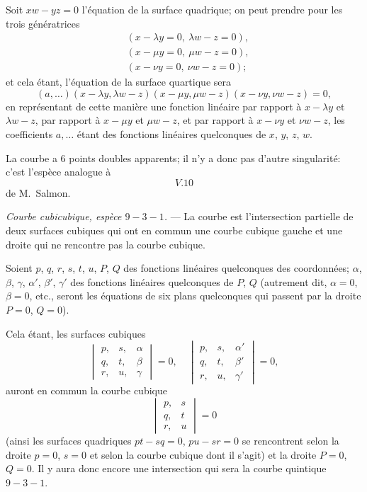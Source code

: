 \documentclass[11pt,a4paper]{article}
\begin{document}
Soit $xw - yz = 0$ l'\'{e}quation de la surface quadrique; on peut prendre pour les trois g\'{e}n\'{e}ratrices
\begin{align*}
& (x - \lambda y = 0, \ \lambda w - z = 0), \\
& (x - \mu y = 0, \ \mu w - z = 0), \\
& (x - \nu y = 0, \ \nu w - z = 0);
\end{align*}
et cela \'{e}tant, l'\'{e}quation de la surface quartique sera
\[
(a, \ldots)(x - \lambda y, \lambda w - z)(x - \mu y, \mu w - z)(x - \nu y, \nu w - z) = 0,
\]
en repr\'{e}sentant de cette mani\`{e}re une fonction lin\'{e}aire par rapport \`{a} $x - \lambda y$ et $\lambda w - z$, par rapport \`{a} $x - \mu y$ et $\mu w - z$, et par rapport \`{a} $x - \nu y$ et $\nu w - z$, les coefficients $a, \ldots$ \'{e}tant des fonctions lin\'{e}aires quelconques de $x$, $y$, $z$, $w$.

La courbe a 6 points doubles apparents; il n'y a donc pas d'autre singularit\'{e}: c'est l'esp\`{e}ce analogue \`{a}
\[
V.10
\]
de M.~Salmon.

\clearpage

\medskip
\noindent\textit{Courbe cubicubique, esp\`{e}ce $9 - 3 - 1$.} --- La courbe est l'intersection partielle de deux surfaces cubiques qui ont en commun une courbe cubique gauche et une droite qui ne rencontre pas la courbe cubique.

Soient $p$, $q$, $r$, $s$, $t$, $u$, $P$, $Q$ des fonctions lin\'{e}aires quelconques des coordonn\'{e}es; $\alpha$, $\beta$, $\gamma$, $\alpha'$, $\beta'$, $\gamma'$ des fonctions lin\'{e}aires quelconques de $P$, $Q$ (autrement dit, $\alpha = 0$, $\beta = 0$, etc., seront les \'{e}quations de six plans quelconques qui passent par la droite $P = 0$, $Q = 0$).

Cela \'{e}tant, les surfaces cubiques
\[
\begin{vmatrix}
p, & s, & \alpha \\
q, & t, & \beta \\
r, & u, & \gamma
\end{vmatrix} = 0,
\quad
\begin{vmatrix}
p, & s, & \alpha' \\
q, & t, & \beta' \\
r, & u, & \gamma'
\end{vmatrix} = 0,
\]
auront en commun la courbe cubique
\[
\begin{vmatrix}
p, & s \\
q, & t \\
r, & u
\end{vmatrix} = 0
\]
(ainsi les surfaces quadriques $pt - sq = 0$, $pu - sr = 0$ se rencontrent selon la droite $p = 0$, $s = 0$ et selon la courbe cubique dont il s'agit) et la droite $P = 0$, $Q = 0$. Il y aura donc encore une intersection qui sera la courbe quintique $9 - 3 - 1$.
\end{document}
